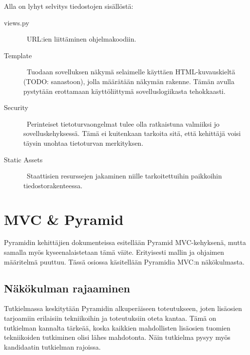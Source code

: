 \documentclass[finnish,utf8,nonumbib,palatino,kandi]{gradu2}
\begin{document}
Alla on lyhyt selvitys tiedostojen sisällöstä:
\begin{description}
\item [views.py] \ URL:ien liittäminen ohjelmakoodiin.
\item[Template] \ Tuodaan sovelluksen näkymä selaimelle käyttäen HTML-kuvauskieltä (TODO: sanastoon), jolla määrätään näkymän rakenne. Tämän avulla pystytään erottamaan käyttöliittymä sovelluslogiikasta tehokkaasti.
\item[Security] \ Perinteiset tietoturvaongelmat tulee olla ratkaistuna valmiiksi jo sovelluskehyksessä. Tämä ei kuitenkaan tarkoita sitä, että kehittäjä voisi täysin unohtaa tietoturvan merkityksen.
\item[Static Assets] \ Staattisien resurssejen jakaminen niille tarkoitettuihin paikkoihin tiedostorakenteessa.
\end{description}


\section{MVC \& Pyramid}
Pyramidin kehittäjien dokumenteissa esitellään Pyramid MVC-kehyksenä, mutta samalla myös kyseenalaistetaan tämä väite. Erityisesti mallin ja ohjaimen määritelmä puuttuu. Tässä
osiossa käsitellään Pyramidia MVC:n näkökulmasta.  \cite{Pyramid:intr}

\subsection{Näkökulman rajaaminen}
Tutkielmassa keskitytään Pyramidin alkuperäiseen toteutukseen, joten lisäosien tarjoamiin erilaisiin tekniikoihin ja toteutuksiin oteta kantaa. Tämä on tutkielman kannalta tärkeää, koska kaikkien
mahdollisten lisäosien tuomien tekniikoiden tutkiminen olisi lähes mahdotonta. Näin tutkielma pysyy myös kandidaatin tutkielman rajoissa.
\end{document}
